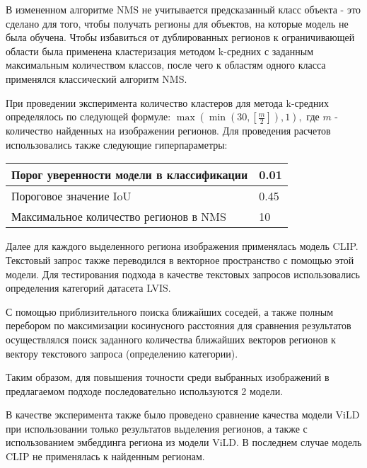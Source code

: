 \documentclass[a4paper,14pt]{article}
\begin{document}
    В измененном алгоритме NMS не учитывается предсказанный класс объекта - это сделано для того, чтобы получать регионы  для объектов, на которые модель не была обучена. Чтобы избавиться от дублированных регионов к ограничивающей области была применена кластеризация методом k-средних с заданным максимальным количеством классов, после чего к областям одного класса применялся классический алгоритм NMS. 
    
    
    При проведении эксперимента количество кластеров для метода k-средних определялось по следующей формуле: $\max(\min(30, \left[\frac{m}{2}\right]), 1),$ где $m$ - количество найденных на изображении регионов. Для проведения расчетов использовались также следующие гиперпараметры:
    \begin{center}
    	\begin{tabular}{| l | l |}
    		\hline
    		Порог уверенности модели в классификации & 0.01\\ \hline
    		Пороговое значение IoU & 0.45 \\ \hline
    		Максимальное количество регионов в NMS  & 10\\
    		\hline
    	\end{tabular}
    \end{center}

	Далее для каждого выделенного региона изображения применялась модель CLIP. Текстовый запрос также переводился в векторное пространство с помощью этой модели. Для тестирования подхода в качестве текстовых запросов использовались определения категорий датасета LVIS.
	
	С помощью приблизительного поиска ближайших соседей, а также полным перебором по максимизации косинусного расстояния для сравнения результатов осуществлялся поиск заданного количества ближайших векторов регионов к вектору текстового запроса (определению категории).
	
    
    Таким образом, для повышения точности среди выбранных изображений в предлагаемом подходе последовательно используются 2 модели.
    
    В качестве эксперимента также было проведено сравнение качества модели ViLD при использовании только результатов выделения регионов, а также с использованием эмбеддинга региона из модели ViLD. В последнем случае модель CLIP не применялась к найденным регионам.
    
\end{document}
